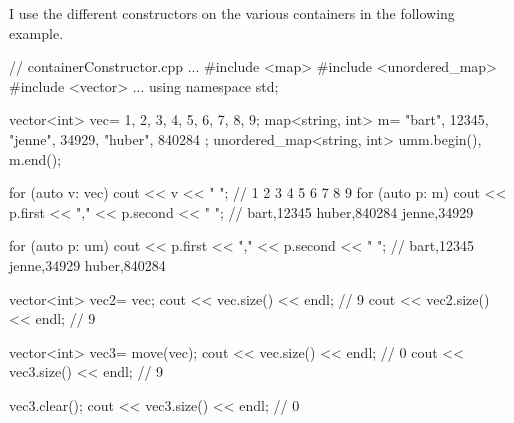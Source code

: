 I use the different constructors on the various containers in the following example.



\begin{cpp}
// containerConstructor.cpp
...
#include <map>
#include <unordered_map>
#include <vector>
...
using namespace std;

vector<int> vec= {1, 2, 3, 4, 5, 6, 7, 8, 9};
map<string, int> m= {{"bart", 12345}, {"jenne", 34929}, {"huber", 840284} };
unordered_map<string, int> um{m.begin(), m.end()};

for (auto v: vec) cout << v << " "; // 1 2 3 4 5 6 7 8 9
for (auto p: m) cout << p.first << "," << p.second << " ";
// bart,12345 huber,840284 jenne,34929

for (auto p: um) cout << p.first << "," << p.second << " ";
// bart,12345 jenne,34929 huber,840284

vector<int> vec2= vec;
cout << vec.size() << endl; // 9
cout << vec2.size() << endl; // 9

vector<int> vec3= move(vec);
cout << vec.size() << endl; // 0
cout << vec3.size() << endl; // 9

vec3.clear();
cout << vec3.size() << endl; // 0
\end{cpp}















